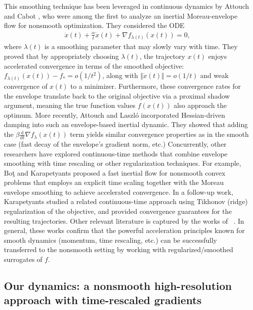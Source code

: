 \documentclass[11pt]{article}
\numberwithin{equation}{section}
\begin{document}
This smoothing technique has been leveraged in continuous dynamics by Attouch and Cabot \cite{AttouchCabot2018JDE}, who were among the first to analyze an {inertial Moreau-envelope flow} for nonsmooth optimization. They considered the ODE
\begin{align*}
    \ddot{x}(t)+\frac{\alpha}{t}\dot{x}(t)+\nabla f_{\lambda(t)}(x(t))=0,
\end{align*}
where $\lambda(t)$ is a smoothing parameter that may slowly vary with time. They proved that by appropriately choosing $\lambda(t)$, the trajectory $x(t)$ enjoys accelerated convergence in terms of the smoothed objective: $f_{\lambda(t)}(x(t)) - f_* = o(1/t^2)$, along with $\Vert \dot{x}(t)\Vert = o(1/t)$ and weak convergence of $x(t)$ to a minimizer. Furthermore, these convergence rates for the envelope translate back to the original objective via a {proximal shadow} argument, meaning the true function values $f(x(t))$ also approach the optimum. More recently, Attouch and Laszló \cite{AttouchLaszlo2021} incorporated Hessian-driven damping into such an envelope-based inertial dynamic. They showed that adding the $\beta\frac{\mathrm{d}}{\mathrm{d}t}\nabla f_{\lambda}(x(t))$ term yields similar convergence properties as in the smooth case (fast decay of the envelope’s gradient norm, etc.) Concurrently, other researchers have explored continuous-time methods that combine envelope smoothing with time rescaling or other regularization techniques. For example, Boţ and Karapetyants \cite{BotKarapetyants2022} proposed a fast inertial flow for nonsmooth convex problems that employs an explicit time scaling together with the Moreau envelope smoothing to achieve accelerated convergence. In a follow-up work, Karapetyants \cite{Karapetyants2023} studied a related continuous-time approach using Tikhonov (ridge) regularization of the objective, and provided convergence guarantees for the resulting trajectories. Other relevant literature is captured by the works of ~\cite{Adly2026,Cortild2024,AttouchLaszlo2021, AttouchSvaiter2011,WangFadiliOchs2025,AAF}. In general, these works confirm that the powerful acceleration principles known for smooth dynamics (momentum, time rescaling, etc.) can be successfully transferred to the nonsmooth setting by working with regularized/smoothed surrogates of $f$.

\subsection{Our dynamics: a nonsmooth high-resolution approach with time-rescaled gradients}
\end{document}
